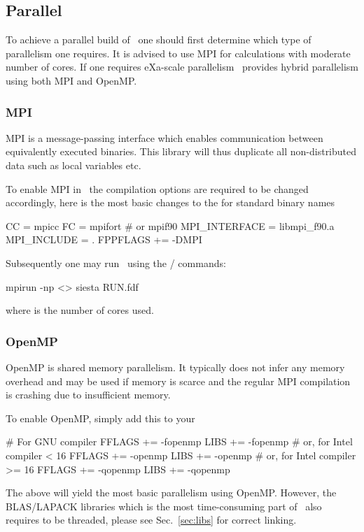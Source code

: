 \subsection{Parallel}
\label{sec:parallel}

To achieve a parallel build of \siesta\ one should first determine
which type of parallelism one requires. It is advised to use MPI for
calculations with moderate number of cores. If one requires eXa-scale
parallelism \siesta\ provides hybrid parallelism using both MPI and
OpenMP. 


\subsubsection{MPI}

MPI is a message-passing interface which enables communication between
equivalently executed binaries. This library will thus duplicate all
non-distributed data such as local variables etc. 

To enable MPI in \siesta\ the compilation options are required to be
changed accordingly, here is the most basic changes to the
 for standard binary names
\begin{shellexample}
  CC = mpicc
  FC = mpifort # or mpif90
  MPI_INTERFACE = libmpi_f90.a
  MPI_INCLUDE = .
  FPPFLAGS += -DMPI
\end{shellexample}


Subsequently one may run \siesta\ using the
/ commands:
\begin{shellexample}
  mpirun -np <> siesta RUN.fdf
\end{shellexample}
where \shell{<>} is the number of cores used.


\subsubsection{OpenMP}

OpenMP is shared memory parallelism. It typically does not infer any
memory overhead and may be used if memory is scarce and the regular
MPI compilation is crashing due to insufficient memory.

To enable OpenMP, simply add this to your 
\begin{shellexample}
  # For GNU compiler
  FFLAGS += -fopenmp
  LIBS += -fopenmp
  # or, for Intel compiler < 16
  FFLAGS += -openmp
  LIBS += -openmp
  # or, for Intel compiler >= 16
  FFLAGS += -qopenmp
  LIBS += -qopenmp
\end{shellexample}
The above will yield the most basic parallelism using OpenMP. However,
the BLAS/LAPACK libraries which is the most time-consuming part of
\siesta\ also requires to be threaded, please see Sec.~\ref{sec:libs}
for correct linking.

